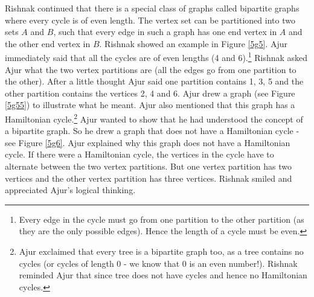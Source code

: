 Rishnak continued that there is a special class of graphs called bipartite graphs where every cycle is of even length. The vertex set can be partitioned into two sets $A$ and $B$, such that every edge in such a graph has one end vertex in $A$ and the other end vertex in $B$. Rishnak showed an example in Figure \ref{5g5}. Ajur immediately said that all the cycles are of even lengths (4 and 6).\footnote{Every edge in the cycle must go from one partition to the other partition (as they are the only possible edges). Hence the length of a cycle must be even.} Rishnak asked Ajur what the two vertex partitions are (all the edges go from one partition to the other). After a little thought Ajur said one partition contains 1, 3, 5 and the other partition contains the vertices 2, 4 and 6. Ajur drew a graph (see Figure \ref{5g55}) to illustrate  what he meant. Ajur also mentioned that this graph has a Hamiltonian cycle.\footnote{Ajur exclaimed that every tree is a bipartite graph too, as a tree contains no cycles (or cycles of length 0 - we know that 0 is an even number!). Rishnak reminded Ajur that since tree does not have cycles and hence no Hamiltonian cycles.} 
Ajur wanted to show that he had understood the concept of a bipartite graph. So he drew a graph that does not have a Hamiltonian cycle - see Figure \ref{5g6}. Ajur explained why this graph does not have a Hamiltonian cycle. If there were a Hamiltonian cycle, the vertices in the cycle have to alternate between the two vertex partitions. But one vertex partition has two vertices and the other vertex partition has three vertices. Rishnak smiled and appreciated Ajur's logical thinking.

